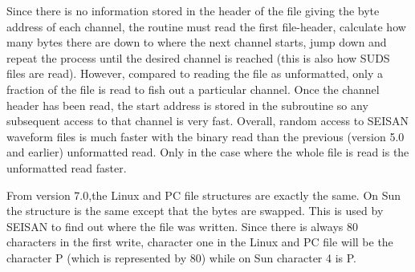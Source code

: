 Since there is no information stored in the header of the file giving the byte address of each channel, the routine must read the first file-header, calculate how many bytes there are down to where the next channel starts, jump down and repeat the process until the desired channel is reached (this is also how SUDS files are read). However, compared to reading the file as unformatted, only a fraction of the file is read to fish out a particular channel. Once the channel header has been read, the start address is stored in the subroutine so any subsequent access to that channel is very fast. Overall, random access to SEISAN waveform files is much faster with the binary read than the previous (version 5.0 and earlier) unformatted read. Only in the case where the whole file is read is the unformatted read faster. 



From version 7.0,the Linux and PC file structures are exactly the same. On Sun the structure is the same except that the bytes are swapped. This is used by SEISAN to find out where the file was written. Since there is always 80 characters in the first write, character one in the Linux and PC file will be the character P (which is represented by 80) while on Sun character 4 is P.  

